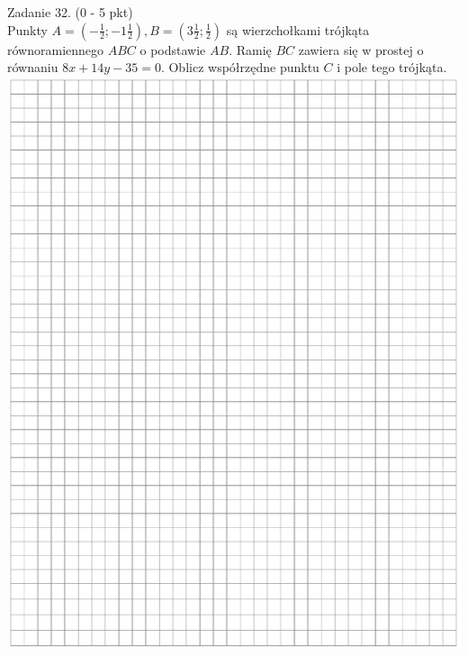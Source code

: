 \documentclass[10pt]{article}
\begin{document}
Zadanie 32. (0 - 5 pkt)\\
Punkty \(A=\left(-\frac{1}{2} ;-1 \frac{1}{2}\right), B=\left(3 \frac{1}{2} ; \frac{1}{2}\right)\) są wierzchołkami trójkąta równoramiennego \(A B C\) o podstawie \(A B\). Ramię \(B C\) zawiera się w prostej o równaniu \(8 x+14 y-35=0\). Oblicz współrzędne punktu \(C\) i pole tego trójkąta.\\
\includegraphics[max width=\textwidth, center]{2024_11_21_832f1bc2b626663f1df2g-14}\\
\end{document}
